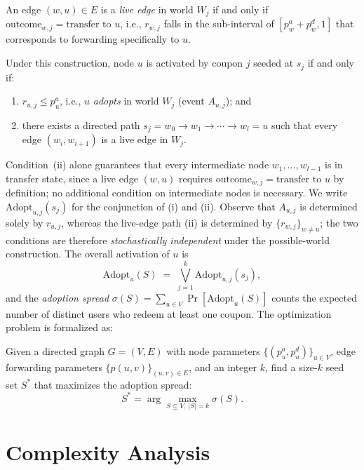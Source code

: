 \documentclass[sigconf]{acmart}
\begin{document}
\begin{definition}
An edge $(w, u) \in E$ is a \emph{live edge} in world $W_j$ if and only if $\mathrm{outcome}_{w,j} = \text{transfer to } u$, i.e., $r_{w,j}$ falls in the sub-interval of $[p_w^a + p_w^d, 1]$ that corresponds to forwarding specifically to $u$.
\end{definition}

Under this construction, node $u$ is activated by coupon $j$ seeded at $s_j$ if and only if:
\begin{enumerate}[label=(\roman*)]
  \item $r_{u,j} \leq p_u^a$, i.e., $u$ \emph{adopts} in world $W_j$ (event $A_{u,j}$); and
  \item there exists a directed path $s_j = w_0 \to w_1 \to \cdots \to w_l = u$ such that every edge $(w_i, w_{i+1})$ is a live edge in $W_j$.
\end{enumerate}
Condition~(ii) alone guarantees that every intermediate node $w_1, \ldots, w_{l-1}$ is in transfer state, since a live edge $(w, u)$ requires $\mathrm{outcome}_{w,j} = \text{transfer to }u$ by definition; no additional condition on intermediate nodes is necessary. We write $\mathrm{Adopt}_{u,j}(s_j)$ for the conjunction of (i) and (ii). Observe that $A_{u,j}$ is determined solely by $r_{u,j}$, whereas the live-edge path (ii) is determined by $\{r_{w,j}\}_{w \neq u}$; the two conditions are therefore \emph{stochastically independent} under the possible-world construction. The overall activation of $u$ is
\[
  \mathrm{Adopt}_u(S) \;=\; \bigvee_{j=1}^{k} \mathrm{Adopt}_{u,j}(s_j),
\]
and the \emph{adoption spread} $\sigma(S) = \sum_{u \in V} \Pr[\mathrm{Adopt}_u(S)]$ counts the expected number of distinct users who redeem at least one coupon. The optimization problem is formalized as:

\begin{definition}[SIDIM]
Given a directed graph $G = (V, E)$ with node parameters $\{(p_u^a, p_u^d)\}_{u \in V}$, edge forwarding parameters $\{p(u, v)\}_{(u, v) \in E}$, and an integer $k$, find a size-$k$ seed set $S^*$ that maximizes the adoption spread:
\begin{equation}
S^* = \arg\max_{S \subseteq V,\ |S| = k} \sigma(S).
\end{equation}
\end{definition}


\section{Complexity Analysis}
\label{sec:complexity}
\end{document}

